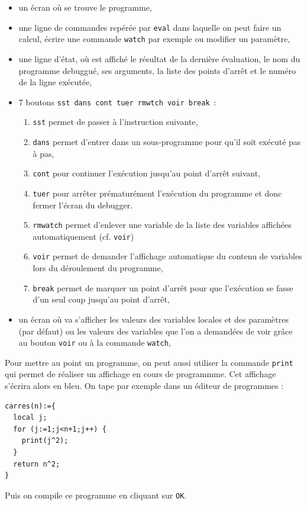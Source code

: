 \documentclass[a4paper,11pt]{article}
\begin{document}
\begin{itemize}
\item un \'ecran o\`u se trouve le programme,
\item une ligne de commandes rep\'er\'ee par {\tt eval} dans laquelle on peut
faire un calcul, \'ecrire une commande {\tt watch} par exemple ou modifier un 
param\`etre,
\item une ligne d'\'etat, o\`u est affich\'e le r\'esultat de la
  derni\`ere \'evaluation, le nom du programme debuggu\'e, ses
  arguments, la liste des points d'arr\^et et le num\'ero de la ligne 
ex\'ecut\'ee,
\item 7 boutons {\tt sst dans cont tuer rmwtch voir break}~:
\begin{enumerate}
\item {\tt sst} permet de passer \`a l'instruction suivante,
\item {\tt dans} permet d'entrer dans un sous-programme pour qu'il soit 
ex\'ecut\'e pas \`a pas,
\item {\tt cont} pour continuer l'ex\'ecution jusqu'au point d'arr\^et suivant,
\item {\tt tuer} pour arr\^eter pr\'ematur\'ement l'ex\'ecution
du programme et donc fermer l'\'ecran du debugger.
\item {\tt rmwatch} permet d'enlever une variable de la liste des variables 
affich\'ees automatiquement (cf. {\tt voir})
\item {\tt voir} permet de demander l'affichage automatique du contenu
de variables lors du d\'eroulement  du programme,
\item {\tt break} permet de marquer un point d'arr\^et pour que l'ex\'ecution 
se fasse d'un seul coup jusqu'au point d'arr\^et,
\end{enumerate}
\item un \'ecran o\`u va s'afficher les valeurs des variables locales
et des param\`etres (par d\'efaut) ou les valeurs des variables
que l'on a demand\'ees de voir 
gr\^ace au bouton {\tt voir} ou \`a la commande {\tt watch}, 
\end{itemize}

Pour mettre au point un programme, on peut aussi utiliser la commande 
{\tt print} qui permet de r\'ealiser un affichage en cours de programmme.
Cet affichage s'\'ecrira alors en bleu.
On tape par exemple dans un \'editeur de programmes :
\begin{verbatim}
carres(n):={
  local j;
  for (j:=1;j<n+1;j++) {
    print(j^2);
  }
  return n^2;
}
\end{verbatim}
Puis on compile ce programme en cliquant sur {\tt OK}.
\end{document}
